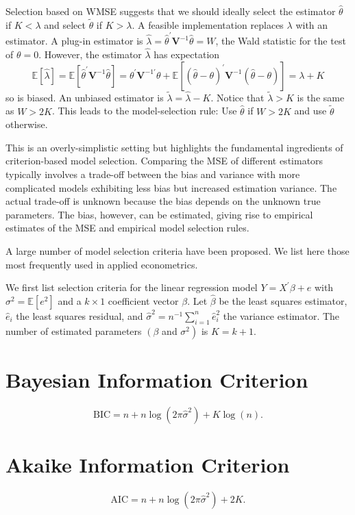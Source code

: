 \documentclass[10pt]{article}
\begin{document}
Selection based on WMSE suggests that we should ideally select the estimator $\widehat{\theta}$ if $K<\lambda$ and select $\tilde{\theta}$ if $K>\lambda$. A feasible implementation replaces $\lambda$ with an estimator. A plug-in estimator is $\hat{\lambda}=\widehat{\theta}^{\prime} \boldsymbol{V}^{-1} \widehat{\theta}=W$, the Wald statistic for the test of $\theta=0$. However, the estimator $\widehat{\lambda}$ has expectation
$$
\mathbb{E}[\widehat{\lambda}]=\mathbb{E}\left[\widehat{\theta}^{\prime} \boldsymbol{V}^{-1} \hat{\theta}\right]=\theta^{\prime} \boldsymbol{V}^{-1 \prime} \theta+\mathbb{E}\left[(\widehat{\theta}-\theta)^{\prime} \boldsymbol{V}^{-1}(\widehat{\theta}-\theta)\right]=\lambda+K
$$
so is biased. An unbiased estimator is $\tilde{\lambda}=\widehat{\lambda}-K$. Notice that $\tilde{\lambda}>K$ is the same as $W>2 K$. This leads to the model-selection rule: Use $\widehat{\theta}$ if $W>2 K$ and use $\widetilde{\theta}$ otherwise.

This is an overly-simplistic setting but highlights the fundamental ingredients of criterion-based model selection. Comparing the MSE of different estimators typically involves a trade-off between the bias and variance with more complicated models exhibiting less bias but increased estimation variance. The actual trade-off is unknown because the bias depends on the unknown true parameters. The bias, however, can be estimated, giving rise to empirical estimates of the MSE and empirical model selection rules.

A large number of model selection criteria have been proposed. We list here those most frequently used in applied econometrics.

We first list selection criteria for the linear regression model $Y=X^{\prime} \beta+e$ with $\sigma^{2}=\mathbb{E}\left[e^{2}\right]$ and a $k \times 1$ coefficient vector $\beta$. Let $\widehat{\beta}$ be the least squares estimator, $\widehat{e}_{i}$ the least squares residual, and $\widehat{\sigma}^{2}=n^{-1} \sum_{i=1}^{n} \widehat{e}_{i}^{2}$ the variance estimator. The number of estimated parameters $\left(\beta\right.$ and $\left.\sigma^{2}\right)$ is $K=k+1$.

\section{Bayesian Information Criterion}
$$
\mathrm{BIC}=n+n \log \left(2 \pi \widehat{\sigma}^{2}\right)+K \log (n) .
$$

\section{Akaike Information Criterion}
$$
\mathrm{AIC}=n+n \log \left(2 \pi \widehat{\sigma}^{2}\right)+2 K .
$$
\end{document}
